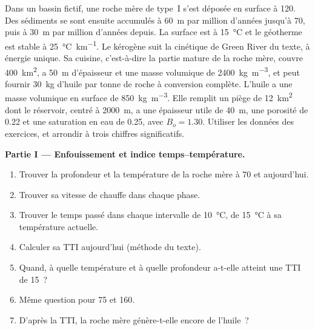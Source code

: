 \begin{problem}\label{pb:b2:energy-geology:1}
Dans un bassin fictif, une roche mère de type~I s'est déposée en surface à \qty{120}{\Ma}. Des sédiments se sont ensuite accumulés à \qty{60}{m} par million d'années jusqu'à \qty{70}{\Ma}, puis à \qty{30}{m}
par million d'années depuis. La surface est à \qty{15}{\celsius} et le géotherme est stable à \qty{25}{\celsius\per\km}.
Le kérogène suit la cinétique de Green River du texte, à énergie unique.
Sa cuisine, c'est-à-dire la partie mature de la roche mère, couvre \qty{400}{km^2}, a \qty{50}{m} d'épaisseur
et une masse volumique de \qty{2400}{kg.m^{-3}}, et peut fournir \qty{30}{kg} d'huile par tonne de roche à conversion complète.
L'huile a une masse volumique en surface de \qty{850}{kg.m^{-3}}. Elle remplit un piège de
\qty{12}{km^2} dont le réservoir, centré à \qty{2000}{m}, a une épaisseur utile de \qty{40}{m},
une porosité de 0.22 et une saturation en eau de 0.25, avec $B_o = 1.30$.
Utiliser les données des exercices, et arrondir à
trois chiffres significatifs.

\noindent\textbf{Partie I --- Enfouissement et indice temps--température.}
\begin{enumerate}
  \item Trouver la profondeur et la température de la roche mère à \qty{70}{\Ma} et aujourd'hui.
  \item Trouver sa vitesse de chauffe dans chaque phase.
  \item Trouver le temps passé dans chaque intervalle de \qty{10}{\celsius}, de \qty{15}{\celsius} à
        sa température actuelle.
  \item Calculer sa TTI aujourd'hui (méthode du texte).
  \item Quand, à quelle température et à quelle profondeur a-t-elle atteint une TTI de 15~?
  \item Même question pour 75 et 160.
  \item D'après la TTI, la roche mère génère-t-elle encore de l'huile~?
\end{enumerate}


\end{problem}
